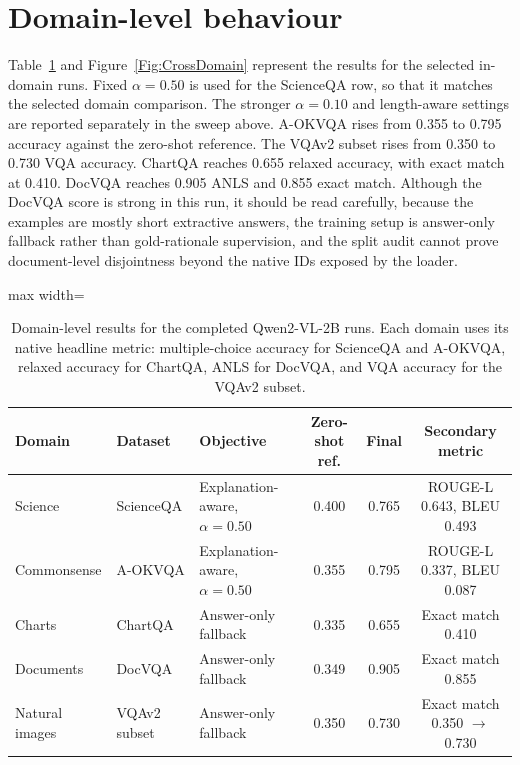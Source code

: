 \documentclass[12pt,bibliography=totoc,listof=totoc,BCOR=5mm,DIV=12,oneside,open=any]{scrbook}
\begin{document}
\section{Domain-level behaviour}
Table~\ref{tab:domain_results} and Figure~\ref{Fig:CrossDomain} represent the results for the selected in-domain runs.
Fixed $\alpha=0.50$ is used for the ScienceQA row, so that it matches the selected domain comparison.
The stronger $\alpha=0.10$ and length-aware settings are reported separately in the sweep above.
A-OKVQA rises from 0.355 to 0.795 accuracy against the zero-shot reference.
The VQAv2 subset rises from 0.350 to 0.730 VQA accuracy.
ChartQA reaches 0.655 relaxed accuracy, with exact match at 0.410.
DocVQA reaches 0.905 ANLS and 0.855 exact match.
Although the DocVQA score is strong in this run, it should be read carefully, because the examples are mostly short extractive answers, the training setup is answer-only fallback rather than gold-rationale supervision, and the split audit cannot prove document-level disjointness beyond the native IDs exposed by the loader.

\begin{table}[!ht]
\centering
\caption{Domain-level results for the completed Qwen2-VL-2B runs. Each domain uses its native headline metric: multiple-choice accuracy for ScienceQA and A-OKVQA, relaxed accuracy for ChartQA, ANLS for DocVQA, and VQA accuracy for the VQAv2 subset.}
\label{tab:domain_results}
\scriptsize
\begin{adjustbox}{max width=\textwidth}
\begin{tabular}{|l|l|l|c|c|c|}
\hline
\textbf{Domain} & \textbf{Dataset} & \textbf{Objective} & \textbf{Zero-shot ref.} & \textbf{Final} & \textbf{Secondary metric} \\ \hline
Science & ScienceQA & Explanation-aware, $\alpha=0.50$ & 0.400 & 0.765 & ROUGE-L 0.643, BLEU 0.493 \\
Commonsense & A-OKVQA & Explanation-aware, $\alpha=0.50$ & 0.355 & 0.795 & ROUGE-L 0.337, BLEU 0.087 \\
Charts & ChartQA & Answer-only fallback & 0.335 & 0.655 & Exact match 0.410 \\
Documents & DocVQA & Answer-only fallback & 0.349 & 0.905 & Exact match 0.855 \\
Natural images & VQAv2 subset & Answer-only fallback & 0.350 & 0.730 & Exact match 0.350 $\rightarrow$ 0.730 \\ \hline
\end{tabular}
\end{adjustbox}
\end{table}
\end{document}
